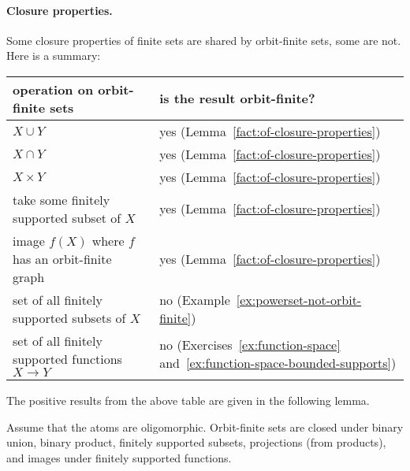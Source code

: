 \paragraph*{Closure properties.} Some closure properties of finite sets are shared by orbit-finite sets, some are not. Here is a summary:
\begin{center}
	\begin{tabular}{l|l}
		operation on orbit-finite sets & is the result orbit-finite?\\ 
		\hline
		$X \cup Y$ & yes ({\small Lemma~\ref{fact:of-closure-properties}})\\
		$X \cap Y$ & yes ({\small Lemma~\ref{fact:of-closure-properties}}) \\
		$X \times Y$ & yes ({\small Lemma~\ref{fact:of-closure-properties}})\\
		take some finitely supported subset of $X$ & yes ({\small Lemma~\ref{fact:of-closure-properties}}) \\
		image $f(X)$ where $f$ has an orbit-finite graph& yes ({\small Lemma~\ref{fact:of-closure-properties}}) \\
		set of all finitely supported subsets of $X$ & no ({\small Example~\ref{ex:powerset-not-orbit-finite}})\\
		set of all finitely supported functions $X \to Y$ & no ({\small Exercises~\ref{ex:function-space} and~\ref{ex:function-space-bounded-supports}})
	\end{tabular}	
\end{center}
The positive results from the above table are given in the following lemma. 
\begin{lemma}\label{fact:of-closure-properties}
Assume that the atoms are oligomorphic. Orbit-finite sets are closed under binary union, binary product, finitely supported subsets, projections (from products), and images under finitely supported functions.
\end{lemma}
